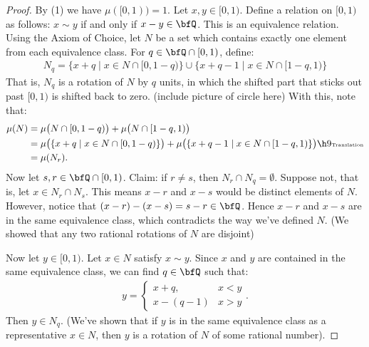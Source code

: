        \begin{proof}
            By (1) we have $\mu([0,1)) = 1$. Let $x,y \in [0,1)$. Define a relation on $[0,1)$ as follows: $x \sim y$ if and only if $x - y \in \bfQ$. This is an equivalence relation. Using the Axiom of Choice, let $N$ be a set which contains exactly one element from each equivalence class. For $q \in \bfQ \cap [0,1)$, define:
                \begin{equation*}
                \begin{split}
                    N_q = \{x + q \mid x \in N \cap [0,1-q)\} \cup \{x + q - 1 \mid x\in N \cap [1-q,1)\}
                \end{split}
                \end{equation*}
            That is, $N_q$ is a rotation of $N$ by $q$ units, in which the shifted part that sticks out past $[0,1)$ is shifted back to zero. (include picture of circle here) With this, note that:
                \begin{equation*}
                \begin{split}
                    \mu(N) 
                    & = \mu \bigl( N \cap [0,1-q) \bigr) + \mu\bigl(N \cap [1-q,1)\bigr) \\
                    & = \mu\bigl( \{x + q \mid x \in N \cap [0,1-q)\}\bigr) + \mu \bigl( \{x + q - 1 \mid x\in N \cap [1-q,1)\}\bigr) \h9\text{\tiny Translation} \\
                    & = \mu(N_r).
                \end{split}
                \end{equation*}
            Now let $s,r \in \bfQ \cap [0,1)$. Claim: if $r \neq s$, then $N_r \cap N_q = \emptyset$. Suppose not, that is, let $x \in N_r \cap N_s$. This means $x - r$ and $x-s$ would be distinct elements of $N$. However, notice that $(x-r) - (x-s) = s - r \in \bfQ$. Hence $x-r$ and $x-s$ are in the same equivalence class, which contradicts the way we've defined $N$. (We showed that any two rational rotations of $N$ are disjoint)
            
            Now let $y \in [0,1)$. Let $x \in N$ satisfy $x \sim y$. Since $x$ and $y$ are contained in the same equivalence class, we can find $q \in \bfQ$ such that:
                \begin{equation*}
                \begin{split}
                    y =
                    \begin{cases}
                        x+q, & x < y \\
                        x - (q-1) & x > y
                    \end{cases}.
                \end{split}
                \end{equation*}
            Then $y \in N_q$. (We've shown that if $y$ is in the same equivalence class as a representative $x \in N$, then $y$ is a rotation of $N$ of some rational number).
        \end{proof}

